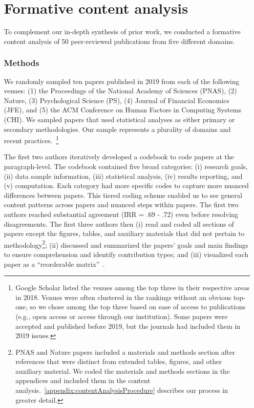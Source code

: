\section{Formative content analysis} \label{sec:contentAnalysisHypoForm} 
To complement our in-depth synthesis of prior work, we conducted a formative
content analysis of 50 peer-reviewed publications from five different domains. 

\subsubsection{Methods}
We randomly sampled ten papers published in 2019 from each of the following
venues: (1) the Proceedings of the National Academy of Sciences (PNAS), (2)
Nature, (3) Psychological Science (PS), (4) Journal of Financial Economics
(JFE), and (5) the ACM Conference on Human Factors in Computing Systems (CHI).
We sampled papers that used statistical analyses as either primary or secondary
methodologies. Our sample represents a plurality of domains and recent
practices.~\footnote{Google Scholar listed the venues among the top three in
their respective areas in 2018. Venues were often clustered in the rankings
without an obvious top-one, so we chose among the top three based on ease of
access to publications (e.g., open access or access through our institution).
Some papers were accepted and published before 2019, but the journals had
included them in 2019 issues.}


The first two authors iteratively developed a codebook to code papers at the
paragraph-level. The codebook contained five broad categories: (i) research
goals, (ii) data sample information, (iii) statistical analysis, (iv) results
reporting, and (v) computation. Each category had more specific codes to capture
more nuanced differences between papers. This tiered coding scheme enabled us to
see general content patterns across papers and nuanced steps within papers. The
first two authors reached substantial agreement (IRR = .69 - .72) even before
resolving disagreements. The first three authors then (i) read and coded all
sections of papers except the figures, tables, and auxiliary materials that did
not pertain to methodology\footnote{PNAS and Nature papers included a materials
and methods section after references that were distinct from extended tables,
figures, and other auxiliary material. We coded the materials and methods
sections in the appendices and included them in the content
analysis.~\autoref{appendix:contentAnalysisProcedure} describes our process in
greater detail.}; (ii) discussed and summarized the papers' goals and main
findings to ensure comprehension and identify contribution types; and (iii)
visualized each paper as a ``reorderable matrix''~\cite{bertin2011graphics}. 

